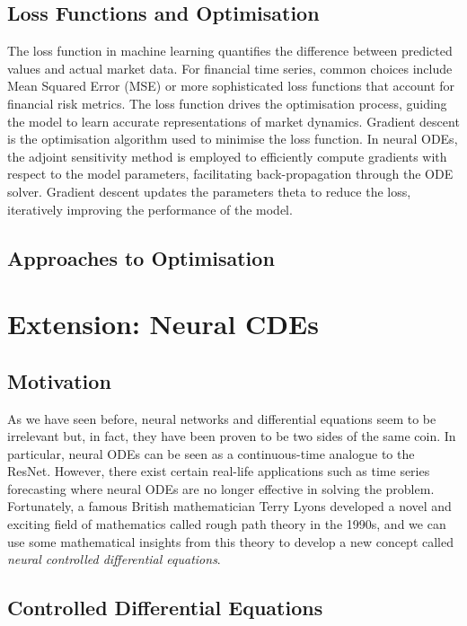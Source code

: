 \documentclass[a4paper,11pt,titlepage]{article}
\def\({}%
\def\){}%
\def\theta{theta}%
\theoremstyle{definition}
\theoremstyle{plain}
\theoremstyle{remark}
\begin{document}
\subsection{Loss Functions and Optimisation}

The loss function in machine learning quantifies the difference between predicted values and actual market data. For financial time series, common choices include Mean Squared Error (MSE) or more sophisticated loss functions that account for financial risk metrics. The loss function drives the optimisation process, guiding the model to learn accurate representations of market dynamics. Gradient descent is the optimisation algorithm used to minimise the loss function. In neural ODEs, the adjoint sensitivity method is employed to efficiently compute gradients with respect to the model parameters, facilitating back-propagation through the ODE solver. Gradient descent updates the parameters \(\theta\) to reduce the loss, iteratively improving the performance of the model.

\subsection{Approaches to Optimisation}

\pagebreak
\section{Extension: Neural CDEs}

\subsection{Motivation}

As we have seen before, neural networks and differential equations seem to be irrelevant but, in fact, they have been proven to be two sides of the same coin. In particular, neural ODEs can be seen as a continuous-time analogue to the ResNet. However, there exist certain real-life applications such as time series forecasting where neural ODEs are no longer effective in solving the problem. Fortunately, a famous British mathematician Terry Lyons developed a novel and exciting field of mathematics called rough path theory in the 1990s, and we can use some mathematical insights from this theory to develop a new concept called \textit{neural controlled differential equations}.

\subsection{Controlled Differential Equations}
\end{document}
